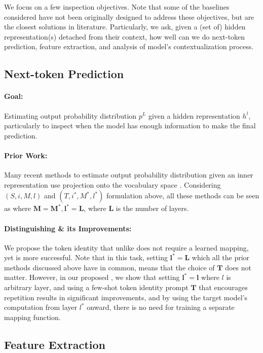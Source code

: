 \documentclass{article}
\theoremstyle{plain}
\theoremstyle{definition}
\theoremstyle{remark}
\begin{document}
We focus on a few inspection objectives. Note that some of the baselines considered have not been originally designed to address these objectives, but are the closest solutions in literature. Particularly, we ask, given a (set of) hidden representation(s) detached from their context, how well can we do next-token prediction, feature extraction, and analysis of model’s contextualization process.

\subsection{Next-token Prediction}
\paragraph{Goal:} Estimating output probability distribution $p^L$ given a hidden representation $h^l$, particularly to inspect when the model has enough information to make the final prediction.

\paragraph{Prior Work:} Many recent methods to estimate output probability distribution given an inner representation use projection onto the vocabulary space  \citep[e.g.,][]{logitlens, din2023jump, belrose2023eliciting}. Considering $(S, i, M, l)$ and $(T, i^*, M^*, l^*)$ formulation above, all these methods can be seen as \methodNamePlural{} where $\mathbf{M=M^*,  l^*=L}$, where $\mathbf{L}$ is the number of layers.

\paragraph{Distinguishing \methodName{} \& its Improvements:} We propose the token identity \methodName{} that unlike \citep{belrose2023eliciting, din2023jump} does not require a learned mapping, yet is more successful. Note that in this task, setting $\mathbf{l^*=L}$ which all the prior methods discussed above have in common, means that the choice of $\mathbf{T}$ does not matter. However, in our proposed \methodName{}, we show that setting $\mathbf{l^*=l}$ where $l$ is arbitrary layer, and using a few-shot token identity prompt $\mathbf{T}$ that encourages repetition results in significant improvements, and by using the target model’s computation from layer $l^*$ onward, there is no need for training a separate mapping function.

\subsection{Feature Extraction}
\end{document}
